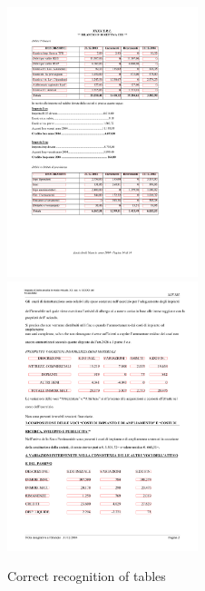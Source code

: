 \begin{figure}[t]
\centering
\includegraphics[width=15em]{img/results/goodRes1.png}
\includegraphics[width=15em]{img/results/goodRes2.png}
\caption{Correct recognition of tables }
\label{fig:sampleResults}
\end{figure}
